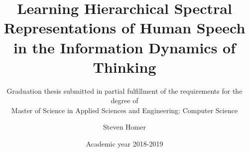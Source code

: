 \author{Steven Homer}
\title{Learning Hierarchical Spectral \\
Representations of Human Speech \\
in the Information Dynamics of Thinking}
\subtitle{Graduation thesis submitted in partial fulfillment of the requirements for the degree of \\Master of Science in Applied Sciences and Engineering: Computer Science}
\date{Academic year 2018-2019}



\pagestyle{fancy}
\setlength{\headheight}{14.5pt}
\renewcommand{\chaptermark}[1]{\markboth{\MakeUppercase{\chaptername}\ \thechapter.\ #1}{}}
\renewcommand{\sectionmark}[1]{\markright{#1}{}}
\fancyhf{}
\fancyhead[LO,RE]{\bfseries\thepage}
\fancyhead[RO]{\bfseries\leftmark}
\fancyhead[LE]{\bfseries\rightmark}
\renewcommand{\headrulewidth}{0.5pt}


\maketheses


\pagebreak
\setcounter{page}{1}


\newpage

\newpage

\newpage

\tableofcontents
\newpage
\listoffigures
\newpage
\listoftables
\newpage
\setcounter{page}{1}
\newpage
